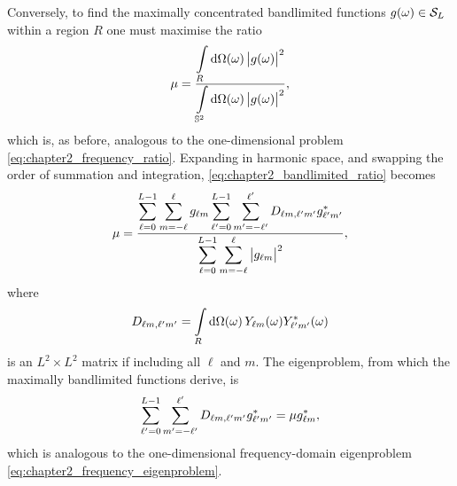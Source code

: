 Conversely, to find the maximally concentrated bandlimited functions \(\pixel{g} \in \spaceBandlimit{}\) within a region \(R\) one must maximise the ratio
%
\begin{equation}\label{eq:chapter2_bandlimited_ratio}
    \mu
    = \frac{\integrateRegion{\sphereVolume} \abs{\pixel{g}}^{2}}
    {\integrateSphere{\omega} \abs{\pixel{g}}^{2}},
\end{equation}
%
which is, as before, analogous to the one-dimensional problem \cref{eq:chapter2_frequency_ratio}.
Expanding in harmonic space, and swapping the order of summation and integration, \cref{eq:chapter2_bandlimited_ratio} becomes
%
\begin{equation}
    \mu
    = \frac{\displaystyle\sum\limits_{\ell=0}^{L-1} \sum\limits_{m=-\ell}^{\ell} \harmonic{g}
        \sum\limits_{\ell'=0}^{L-1} \sum\limits_{m'=-\ell'}^{\ell'} \Dmatrix \conj{\harmonic[']{g}}}
    {\displaystyle\sum\limits_{\ell=0}^{L-1} \sum\limits_{m=-\ell}^{\ell} \abs{\harmonic{g}}^{2}},
\end{equation}
%
where
%
\begin{equation}
    \Dmatrix
    = \integrateRegion{\sphereVolume} \pixel{\harmonic{Y}} \pixel{\conj{\harmonic[']{Y}}}
\end{equation}
%
is an \(L^{2} \times L^{2}\) matrix if including all \(\ell{}\) and \(m\).
The eigenproblem, from which the maximally bandlimited functions derive, is
%
\begin{equation}\label{eq:chapter2_harmonic_eigenproblem}
    \sum\limits_{\ell'=0}^{L-1} \sum\limits_{m'=-\ell'}^{\ell'} \Dmatrix \conj{\harmonic[']{g}}
    = \mu \conj{\harmonic{g}},
\end{equation}
%
which is analogous to the one-dimensional frequency-domain eigenproblem \cref{eq:chapter2_frequency_eigenproblem}.

